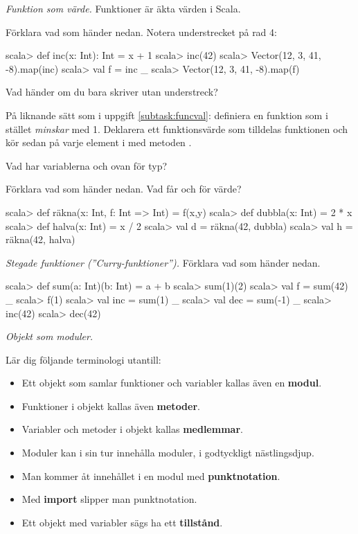 \Task \emph{Funktion som värde.} Funktioner är äkta värden i Scala.

\Subtask \label{subtask:funcval} Förklara vad som händer nedan. Notera understrecket på rad 4:

\begin{REPL}[numbers=left, numberstyle=\color{black}\ttfamily\scriptsize\selectfont]
scala> def inc(x: Int): Int = x + 1
scala> inc(42)
scala> Vector(12, 3, 41, -8).map(inc)
scala> val f = inc _
scala> Vector(12, 3, 41, -8).map(f)
\end{REPL}

\Subtask Vad händer om du bara skriver  utan understreck?

\Subtask På liknande sätt som i uppgift \ref{subtask:funcval}: definiera en funktion  som i stället \emph{minskar} med 1. Deklarera ett funktionsvärde  som tilldelas funktionen  och kör sedan  på varje element i  med metoden .

\Subtask\Pen Vad har variablerna  och  ovan för typ?

\Subtask Förklara vad som händer nedan. Vad får  och  för värde?

\begin{REPL}
scala> def räkna(x: Int, f: Int => Int) = f(x,y)
scala> def dubbla(x: Int) = 2 * x
scala> def halva(x: Int) = x / 2
scala> val d = räkna(42, dubbla)
scala> val h = räkna(42, halva)
\end{REPL}

\Task\emph{Stegade funktioner (''Curry-funktioner'').} Förklara vad som händer nedan.
\begin{REPL}
scala> def sum(a: Int)(b: Int) = a + b
scala> sum(1)(2)
scala> val f = sum(42) _
scala> f(1)
scala> val inc = sum(1) _
scala> val dec = sum(-1) _
scala> inc(42)
scala> dec(42)
\end{REPL}

\Task \emph{Objekt som moduler.} 

\Subtask Lär dig följande terminologi utantill: 

\begin{itemize}[noitemsep, nolistsep]
\item Ett objekt som samlar funktioner och variabler kallas även en \textbf{modul}. 
\item Funktioner i objekt kallas även \textbf{metoder}. 
\item Variabler och metoder i objekt kallas \textbf{medlemmar}. 
\item Moduler kan i sin tur innehålla moduler, i godtyckligt nästlingsdjup. 
\item Man kommer åt innehållet i en modul med \textbf{punktnotation}. 
\item Med \textbf{import} slipper man punktnotation. 
\item Ett objekt med variabler sägs ha ett \textbf{tillstånd}.
\end{itemize}


